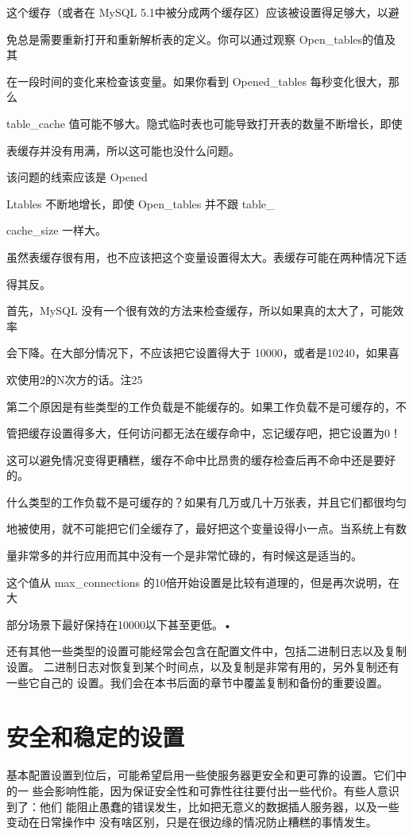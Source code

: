 这个缓存（或者在 MySQL 5.1中被分成两个缓存区）应该被设置得足够大，以避

免总是需要重新打开和重新解析表的定义。你可以通过观察 Open\_tables的值及其

在一段时间的变化来检查该变量。如果你看到 Opened\_tables 每秒变化很大，那么

table\_cache 值可能不够大。隐式临时表也可能导致打开表的数量不断增长，即使

表缓存并没有用满，所以这可能也没什么问题。

该问题的线索应该是 Opened

Ltables 不断地增长，即使 Open\_tables 并不跟 table\_

cache\_size 一样大。

虽然表缓存很有用，也不应该把这个变量设置得太大。表缓存可能在两种情况下适

得其反。

首先，MySQL 没有一个很有效的方法来检查缓存，所以如果真的太大了，可能效率

会下降。在大部分情况下，不应该把它设置得大于 10000，或者是10240，如果喜

欢使用2的N次方的话。注25

第二个原因是有些类型的工作负载是不能缓存的。如果工作负载不是可缓存的，不

管把缓存设置得多大，任何访问都无法在缓存命中，忘记缓存吧，把它设置为0！

这可以避免情况变得更糟糕，缓存不命中比昂贵的缓存检查后再不命中还是要好的。

什么类型的工作负载不是可缓存的？如果有几万或几十万张表，并且它们都很均匀

地被使用，就不可能把它们全缓存了，最好把这个变量设得小一点。当系统上有数

量非常多的并行应用而其中没有一个是非常忙碌的，有时候这是适当的。

这个值从 max\_connections 的10倍开始设置是比较有道理的，但是再次说明，在大

部分场景下最好保持在10000以下甚至更低。•

还有其他一些类型的设置可能经常会包含在配置文件中，包括二进制日志以及复制设置。
二进制日志对恢复到某个时间点，以及复制是非常有用的，另外复制还有一些它自己的
设置。我们会在本书后面的章节中覆盖复制和备份的重要设置。

\section{安全和稳定的设置}
基本配置设置到位后，可能希望启用一些使服务器更安全和更可靠的设置。它们中的一
些会影响性能，因为保证安全性和可靠性往往要付出一些代价。有些人意识到了：他们
能阻止愚蠢的错误发生，比如把无意义的数据插人服务器，以及一些变动在日常操作中
没有啥区别，只是在很边缘的情况防止糟糕的事情发生。

